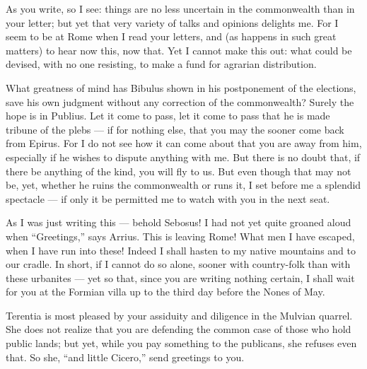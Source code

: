 

 As you write, so I see: things are no less uncertain in the commonwealth than in your letter; but yet that very variety of talks and opinions delights me. For I seem to be at Rome when I read your letters, and (as happens in such great matters) to hear now this, now that. Yet I cannot make this out: what could be devised, with no one resisting, to make a fund for agrarian distribution.

 What greatness of mind has Bibulus shown in his postponement of the elections, save his own judgment without any correction of the commonwealth? Surely the hope is in Publius. Let it come to pass, let it come to pass that he is made tribune of the plebs --- if for nothing else, that you may the sooner come back from Epirus. For I do not see how it can come about that you are away from him, especially if he wishes to dispute anything with me. But there is no doubt that, if there be anything of the kind, you will fly to us. But even though that may not be, yet, whether he ruins the commonwealth or runs it, I set before me a splendid spectacle --- if only it be permitted me to watch with you in the next seat.

 As I was just writing this --- behold Sebosus! I had not yet quite groaned aloud when ``Greetings,'' says Arrius. This is leaving Rome! What men I have escaped, when I have run into these! Indeed I shall hasten to my native mountains and to our cradle. In short, if I cannot do so alone, sooner with country-folk than with these urbanites --- yet so that, since you are writing nothing certain, I shall wait for you at the Formian villa up to the third day before the Nones of May.

 Terentia is most pleased by your assiduity and diligence in the Mulvian quarrel. She does not realize that you are defending the common case of those who hold public lands; but yet, while you pay something to the publicans, she refuses even that. So she, ``and little Cicero,'' send greetings to you.
